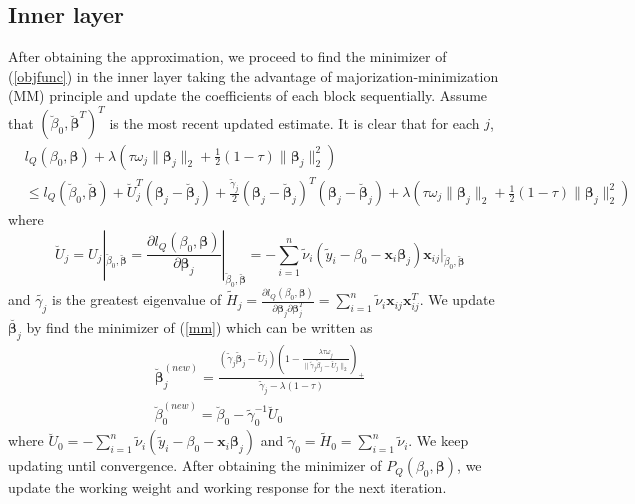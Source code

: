 \documentclass[paper=a4, fontsize=11pt]{scrartcl} %
\begin{document}
\subsection*{\textbf{Inner layer}}		
After obtaining the approximation, we proceed to find the minimizer of (\ref{objfunc}) in the inner layer taking the advantage of majorization-minimization (MM) principle and update the coefficients of each block sequentially. Assume that $(\breve{\beta}_{0},\breve{\boldsymbol{\beta}}^{T})^{T}$ is the most recent updated estimate. It is clear that for each $j$,
\begin{equation*}\label{mm}
\begin{split}
&l_{Q}(\beta_{0},\boldsymbol{\beta})+\lambda(\tau\omega_{j}\|\boldsymbol{\beta}_{j}\|_{2}+\frac{1}{2}(1-\tau)\|\boldsymbol{\beta}_{j}\|_{2}^{2})\\
&\le l_{Q}(\breve{\beta}_{0},\breve{\boldsymbol{\beta}})+\breve{U}_{j}^{T}(\boldsymbol{\beta}_{j}-\breve{\boldsymbol{\beta}}_{j})+\frac{\tilde{\gamma}_{j}}{2}(\boldsymbol{\beta}_{j}-\breve{\boldsymbol{\beta}}_{j})^{T}(\boldsymbol{\beta}_{j}-\breve{\boldsymbol{\beta}}_{j})+\lambda(\tau\omega_{j}\|\boldsymbol{\beta}_{j}\|_{2}+\frac{1}{2}(1-\tau)\|\boldsymbol{\beta}_{j}\|_{2}^{2})
\end{split}
\end{equation*}
where
\begin{equation}
\breve{U}_{j}=U_{j}|_{\breve{\beta}_{0},\breve{\boldsymbol{\beta}}}=\frac{\partial l_{Q}(\beta_{0},\boldsymbol{\beta})}{\partial \boldsymbol{\beta}_{j}}|_{\breve{\beta}_{0},\breve{\boldsymbol{\beta}}}=-\sum_{i=1}^{n}\tilde{\nu}_{i}(\tilde{y}_{i}-\beta_{0}-\boldsymbol{x}_{i}\boldsymbol{\beta}_{j})\boldsymbol{x}_{ij}|_{\breve{\beta}_{0},\breve{\boldsymbol{\beta}}}
\end{equation}
and $\tilde{\gamma_{j}}$ is the greatest eigenvalue of $\tilde{H}_{j}=\frac{\partial l_{Q}(\beta_{0},\boldsymbol{\beta})}{\partial \boldsymbol{\beta}_{j}\partial \boldsymbol{\beta}_{j}^{T}}=\sum_{i=1}^{n}\tilde{\nu}_{i}\boldsymbol{x}_{ij}\boldsymbol{x}_{ij}^{T}$. We update $\breve{\boldsymbol{\beta}_{j}}$ by find the minimizer of (\ref{mm}) which can be written as
\begin{equation*}
\begin{split}
\breve{\boldsymbol{\beta}}_{j}^{(new)}=\frac{(\tilde{\gamma}_{j}\breve{\boldsymbol{\beta}}_{j}-\breve{U}_{j})(1-\frac{\lambda\tau\omega_{j}}{\|\tilde{\gamma}_{j}\breve{\beta}_{j}-\breve{U}_{j}\|_{2}})_{+}}{\tilde{\gamma}_{j}-\lambda(1-\tau)}\\
\breve{\beta}_{0}^{(new)}=\breve{\beta}_{0}-\tilde{\gamma}_{0}^{-1}\breve{U}_{0}
\end{split}
\end{equation*}
where $\breve{U}_{0}=-\sum_{i=1}^{n}\tilde{\nu}_{i}(\tilde{y}_{i}-\beta_{0}-\boldsymbol{x}_{i}\boldsymbol{\beta}_{j})$ and $\tilde{\gamma}_{0}=\tilde{H}_{0}=\sum_{i=1}^{n}\tilde{\nu}_{i}$. We keep updating until convergence. After obtaining the minimizer of $P_{Q}(\beta_{0},\boldsymbol{\beta})$, we update the working weight and working response for the next iteration.\\
\end{document}
